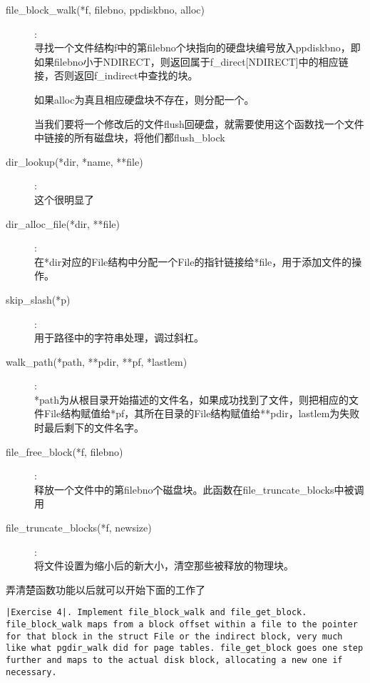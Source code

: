 \documentclass{article}
\begin{document}
\begin{CJK*}{UTF8}{gkai}
\begin{description}
\item[file\_block\_walk(*f, filebno, ppdiskbno, alloc)]:\\
寻找一个文件结构f中的第filebno个块指向的硬盘块编号放入ppdiskbno，即如果filebno小于NDIRECT，则返回属于f\_direct[NDIRECT]中的相应链接，否则返回f\_indirect中查找的块。

如果alloc为真且相应硬盘块不存在，则分配一个。

当我们要将一个修改后的文件flush回硬盘，就需要使用这个函数找一个文件中链接的所有磁盘块，将他们都flush\_block
\item[dir\_lookup(*dir, *name, **file)]:\\
这个很明显了

\item[dir\_alloc\_file(*dir, **file)]:\\
在*dir对应的File结构中分配一个File的指针链接给*file，用于添加文件的操作。

\item[skip\_slash(*p)]:\\
用于路径中的字符串处理，调过斜杠。

\item[walk\_path(*path, **pdir, **pf, *lastlem)]:\\
*path为从根目录开始描述的文件名，如果成功找到了文件，则把相应的文件File结构赋值给*pf，其所在目录的File结构赋值给**pdir，lastlem为失败时最后剩下的文件名字。

\item[file\_free\_block(*f, filebno)]:\\
释放一个文件中的第filebno个磁盘块。此函数在file\_truncate\_blocks中被调用

\item[file\_truncate\_blocks(*f, newsize)]:\\
将文件设置为缩小后的新大小，清空那些被释放的物理块。

\end{description}

弄清楚函数功能以后就可以开始下面的工作了

\newpage

\begin{lstlisting}[style=exercise]
|Exercise 4|. Implement file_block_walk and file_get_block. file_block_walk maps from a block offset within a file to the pointer for that block in the struct File or the indirect block, very much like what pgdir_walk did for page tables. file_get_block goes one step further and maps to the actual disk block, allocating a new one if necessary.


\end{lstlisting}
\end{CJK*}
\end{document}
